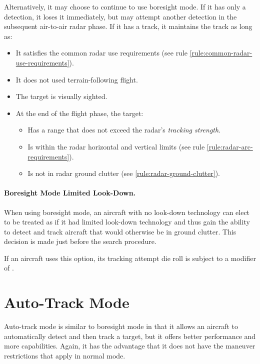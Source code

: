 {\begin{advancedrules}
Alternatively, it may choose to continue to use boresight mode. If it has only a detection, it loses it immediately, but may attempt another detection in the subsequent air-to-air radar phase. If it has a track, it maintains the track as long as:
\begin{itemize}
    \item It satisfies the common radar use requirements (see rule \ref{rule:common-radar-use-requirements}).
    \item It does not used terrain-following flight.
    \item The target is visually sighted.
    \item At the end of the flight phase, the target:
    \begin{itemize}
        \item Has a range that does not exceed the radar's \emph{tracking strength}.
        \item Is within the radar horizontal and vertical limits (see rule \ref{rule:radar-arc-requirements}).
        \item Is not in radar ground clutter (see  \ref{rule:radar-ground-clutter}).
    \end{itemize}
\end{itemize}

\paragraph{Boresight Mode Limited Look-Down.}

When using boresight mode, an aircraft with no look-down technology can elect to be treated as if it had limited look-down technology and thus gain the ability to detect and track aircraft that would otherwise be in ground clutter. This decision is made just before the search procedure. 

If an aircraft uses this option, its tracking attempt die roll is subject to a modifier of . 

\section{Auto-Track Mode}
\label{rule:auto-track-mode} 

Auto-track mode is similar to boresight mode in that it allows an aircraft to automatically detect and then track a target, but it offers better performance and more capabilities. Again, it has the advantage that it does not have the maneuver restrictions that apply in normal mode.


\end{advancedrules}}
